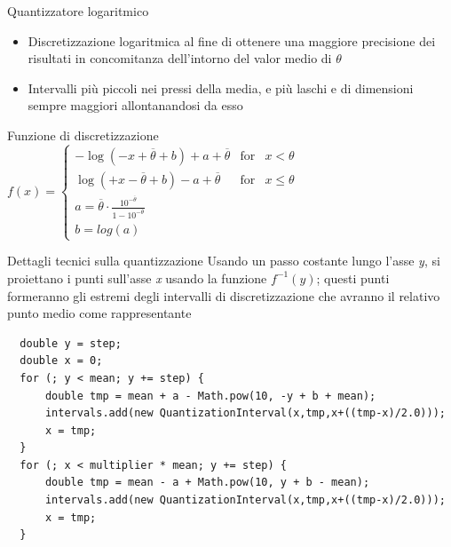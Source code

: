 \documentclass[slidestop,compress,mathserif]{beamer}
\begin{document}
\begin{frame}{Quantizzatore logaritmico}
\vfill
\begin{itemize}
\item Discretizzazione logaritmica al fine di ottenere una maggiore precisione dei risultati in concomitanza dell'intorno del valor medio di $\theta$
\item Intervalli pi\`u piccoli nei pressi della media, e pi\`u laschi e di dimensioni sempre maggiori allontanandosi da esso
\end{itemize}
\begin{block}{Funzione di discretizzazione}
$f(x) =	\left\{ \begin{array}{rcl}  
	-\log(-x+\overline{\theta}+b) + a + \overline{\theta} & \mbox{for} & x<\theta \\ 
	\log(+x-\overline{\theta}+b) - a + \overline{\theta} & \mbox{for} & x\leq\theta \\ 
	a = \overline{\theta}\cdot \frac{10^{-\overline{\theta}}}{1 - 10^{-\overline{\theta}}} & & \\ 
	b = log(a) \end{array} 
 \right.$ 
\end{block}
\vfill
\end{frame}

\begin{frame}[containsverbatim]{Dettagli tecnici sulla quantizzazione}
\vfill
Usando un passo costante lungo l'asse \emph{y}, si proiettano i punti sull'asse \emph{x} usando la funzione $f^{-1}(y)$; questi punti formeranno gli estremi degli intervalli di discretizzazione che avranno il relativo punto medio come rappresentante
\scriptsize
\begin{verbatim}
  double y = step;
  double x = 0;
  for (; y < mean; y += step) {
      double tmp = mean + a - Math.pow(10, -y + b + mean);
      intervals.add(new QuantizationInterval(x,tmp,x+((tmp-x)/2.0)));
      x = tmp;
  }
  for (; x < multiplier * mean; y += step) {
      double tmp = mean - a + Math.pow(10, y + b - mean);
      intervals.add(new QuantizationInterval(x,tmp,x+((tmp-x)/2.0)));
      x = tmp;
  }	
\end{verbatim}
\normalsize
\vfill
\end{frame}

\end{document}
